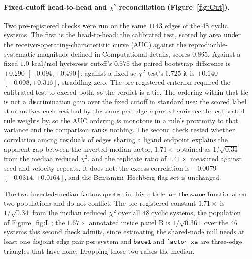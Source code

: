 \paragraph{Fixed-cutoff head-to-head and $\chi^2$ reconciliation (Figure~\ref{fig:Cut}).} Two
pre-registered checks were run on the same $1143$ edges of the $48$ cyclic systems. The first
is the head-to-head: the calibrated test, scored by area under the
receiver-operating-characteristic curve (AUC) against the reproducible-systematic magnitude
defined in Computational details,
scores $0.865$. Against a fixed $1.0$ kcal/mol hysteresis cutoff's $0.575$ the paired bootstrap
difference is $+0.290$ $[+0.094,+0.490]$; against a fixed-$\mathrm{se}$ $\chi^2$ test's $0.725$ it
is $+0.140$ $[-0.008,+0.316]$, straddling zero. The pre-registered criterion required the
calibrated test to exceed both, so the verdict is a tie. The ordering within that tie is not a discrimination gain over the fixed cutoff in standard use: the scored label standardizes each residual by the same per-edge reported variance the calibrated rule weights by, so the AUC ordering is monotone in a rule's proximity to that variance and the comparison ranks nothing. The second check tested whether
correlation among residuals of edges sharing a ligand endpoint explains the apparent gap between
the inverted-median factor, $1.71\times$ obtained as $1/\sqrt{0.34}$ from the median reduced
$\chi^2$, and the replicate ratio of $1.41\times$ measured against seed and velocity repeats. It
does not: the excess correlation is $-0.0079$ $[-0.0314,+0.0164]$, and the Benjamini--Hochberg flag
set is unchanged.

The two inverted-median factors quoted in this article are the same functional on two populations
and do not conflict. The pre-registered constant $1.71\times$ is $1/\sqrt{0.34}$ from the median
reduced $\chi^2$ over all $48$ cyclic systems, the population of Figure~\ref{fig:L}; the
$1.67\times$ annotated inside panel B is $1/\sqrt{0.361}$ over the $46$ systems this second check
admits, since estimating the shared-node null needs at least one disjoint edge pair per system and
\texttt{bace1} and \texttt{factor\_xa} are three-edge triangles that have none. Dropping those two
raises the median.


